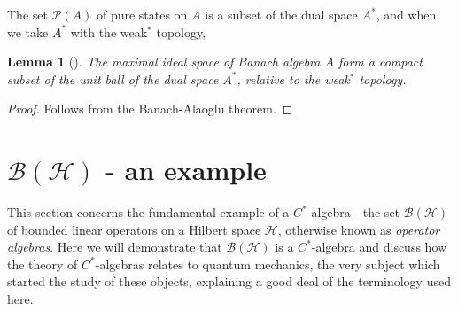 \documentclass[12pt,a4paper]{report}
\theoremstyle{plain}
\newtheorem{lemma}{Lemma}
\theoremstyle{definition}
\newcommand{\1}{\mathbbm{1}}
\newcommand{\C}{\mathbb{C}}
\renewcommand{\H}{\mathcal{H}}
\newcommand{\B}{\mathcal{B}}
\renewcommand{\P}[1]{\mathscr{P}(#1)}
\begin{document}
The set $\P A$ of pure states on $A$ is a subset of the dual space $A^\ast$, and when we take $A^\ast$ with the weak$^\ast$ topology, 

\begin{lemma}[{\cite[3.2.20]{kadison83}}]\label{lemma:3220}
	The maximal ideal space of Banach algebra $A$ form a compact subset of the unit ball of the dual 
	space $A^\ast$, relative to the weak$^\ast$ topology.
\end{lemma}
\begin{proof}
	Follows from the Banach-Alaoglu theorem.
\end{proof}





\section{$\B(\H)$ - an example}
This section concerns the fundamental example of a $C^\ast$-algebra - the set $\B(\H)$ of bounded 
linear operators on a Hilbert space $\H$, otherwise known as \emph{operator algebras}. Here we will 
demonstrate that $\B(\H)$ is a $C^\ast$-algebra and discuss how the theory of $C^\ast$-algebras relates 
to quantum mechanics, the very subject which started the study of these objects, explaining a good deal 
of the terminology used here. 


\end{document}
